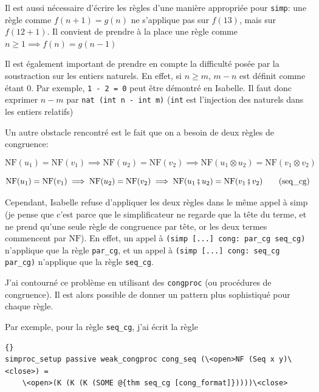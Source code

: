 \documentclass[12pt, a4paper]{article}
\def\nf{ \mathrm{NF} }
\begin{document}
Il est aussi nécessaire d'écrire les règles d'une manière appropriée pour \verb|simp|: une règle comme $f(n+1) = g(n)$ ne s'applique pas sur $f(13)$, mais sur $f(12+1)$. Il convient de prendre à la place une règle comme $n \ge 1 \implies f(n) = g(n-1)$

Il est également important de prendre en compte la difficulté posée par la soustraction sur les entiers naturels. En effet, si $n \ge m$, $m - n$ est définit comme étant $0$. Par exemple, \verb|1 - 2 = 0| peut être démontré en Isabelle. Il faut donc exprimer $n - m$ par \verb|nat (int n - int m)| (\verb|int| est l'injection des naturels dans les entiers relatifs)

\medskip

Un autre obstacle rencontré est le fait que on a besoin de deux règles de congruence:

\vspace{-1em}

\begin{equation}
    \nf(u_1) = \nf(v_1) \implies \nf(u_2) = \nf(v_2) \implies \nf(u_1 \otimes u_2) = \nf(v_1 \otimes v_2)
    \label{cong:par}
    \tag{par\_cg}
\end{equation}

\vspace{-2em}

\begin{equation}
    \nf(u_1) = \nf(v_1) \implies \nf(u_2) = \nf(v_2) \implies \nf(u_1 \fatsemi u_2) = \nf(v_1 \fatsemi v_2)
    \label{cong:seq}
    \tag{seq\_cg}
\end{equation}


Cependant, Isabelle refuse d'appliquer les deux règles dans le même appel à simp (je pense que c'est parce que le simplificateur ne regarde que la tête du terme, et ne prend qu'une seule règle de congruence par tête, or les deux termes commencent par $\nf$). En effet, un appel à \lstinline[language=Isar]|(simp [...] cong: par_cg seq_cg)| n'applique que la règle \lstinline[language=Isar]|par_cg|, et un appel à \lstinline[language=Isar]|(simp [...] cong: seq_cg par_cg)| n'applique que la règle \lstinline[language=Isar]|seq_cg|.


J'ai contourné ce problème en utilisant des \verb|congproc| (ou procédures de congruence). Il est alors possible de donner un pattern plus sophistiqué pour chaque règle.

Par exemple, pour la règle \verb|seq_cg|, j'ai écrit la règle


\begin{lstlisting}[language=Isar]{}
simproc_setup passive weak_congproc cong_seq (\<open>NF (Seq x y)\<close>) =
    \<open>(K (K (K (SOME @{thm seq_cg [cong_format]}))))\<close>
\end{lstlisting}
\end{document}
